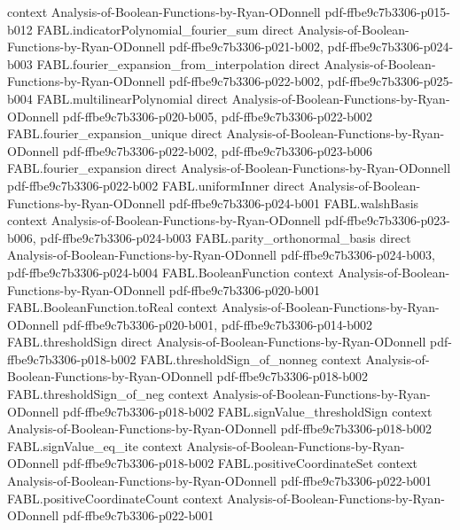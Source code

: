 \begin{theorem}
  {context}
  {Analysis-of-Boolean-Functions-by-Ryan-ODonnell}
  {pdf-ffbe9c7b3306-p015-b012}
\proofstep
  {FABL.indicatorPolynomial_fourier_sum}
  {direct}
  {Analysis-of-Boolean-Functions-by-Ryan-ODonnell}
  {pdf-ffbe9c7b3306-p021-b002,
    pdf-ffbe9c7b3306-p024-b003}
\proofstep
  {FABL.fourier_expansion_from_interpolation}
  {direct}
  {Analysis-of-Boolean-Functions-by-Ryan-ODonnell}
  {pdf-ffbe9c7b3306-p022-b002,
    pdf-ffbe9c7b3306-p025-b004}
\proofstep
  {FABL.multilinearPolynomial}
  {direct}
  {Analysis-of-Boolean-Functions-by-Ryan-ODonnell}
  {pdf-ffbe9c7b3306-p020-b005,
    pdf-ffbe9c7b3306-p022-b002}
\proofstep
  {FABL.fourier_expansion_unique}
  {direct}
  {Analysis-of-Boolean-Functions-by-Ryan-ODonnell}
  {pdf-ffbe9c7b3306-p022-b002,
    pdf-ffbe9c7b3306-p023-b006}
\proofstep
  {FABL.fourier_expansion}
  {direct}
  {Analysis-of-Boolean-Functions-by-Ryan-ODonnell}
  {pdf-ffbe9c7b3306-p022-b002}
\proofstep
  {FABL.uniformInner}
  {direct}
  {Analysis-of-Boolean-Functions-by-Ryan-ODonnell}
  {pdf-ffbe9c7b3306-p024-b001}
\proofstep
  {FABL.walshBasis}
  {context}
  {Analysis-of-Boolean-Functions-by-Ryan-ODonnell}
  {pdf-ffbe9c7b3306-p023-b006,
    pdf-ffbe9c7b3306-p024-b003}
\proofstep
  {FABL.parity_orthonormal_basis}
  {direct}
  {Analysis-of-Boolean-Functions-by-Ryan-ODonnell}
  {pdf-ffbe9c7b3306-p024-b003,
    pdf-ffbe9c7b3306-p024-b004}
\proofstep
  {FABL.BooleanFunction}
  {context}
  {Analysis-of-Boolean-Functions-by-Ryan-ODonnell}
  {pdf-ffbe9c7b3306-p020-b001}
\proofstep
  {FABL.BooleanFunction.toReal}
  {context}
  {Analysis-of-Boolean-Functions-by-Ryan-ODonnell}
  {pdf-ffbe9c7b3306-p020-b001,
    pdf-ffbe9c7b3306-p014-b002}
\proofstep
  {FABL.thresholdSign}
  {direct}
  {Analysis-of-Boolean-Functions-by-Ryan-ODonnell}
  {pdf-ffbe9c7b3306-p018-b002}
\proofstep
  {FABL.thresholdSign_of_nonneg}
  {context}
  {Analysis-of-Boolean-Functions-by-Ryan-ODonnell}
  {pdf-ffbe9c7b3306-p018-b002}
\proofstep
  {FABL.thresholdSign_of_neg}
  {context}
  {Analysis-of-Boolean-Functions-by-Ryan-ODonnell}
  {pdf-ffbe9c7b3306-p018-b002}
\proofstep
  {FABL.signValue_thresholdSign}
  {context}
  {Analysis-of-Boolean-Functions-by-Ryan-ODonnell}
  {pdf-ffbe9c7b3306-p018-b002}
\proofstep
  {FABL.signValue_eq_ite}
  {context}
  {Analysis-of-Boolean-Functions-by-Ryan-ODonnell}
  {pdf-ffbe9c7b3306-p018-b002}
\proofstep
  {FABL.positiveCoordinateSet}
  {context}
  {Analysis-of-Boolean-Functions-by-Ryan-ODonnell}
  {pdf-ffbe9c7b3306-p022-b001}
\proofstep
  {FABL.positiveCoordinateCount}
  {context}
  {Analysis-of-Boolean-Functions-by-Ryan-ODonnell}
  {pdf-ffbe9c7b3306-p022-b001}

\end{theorem}
